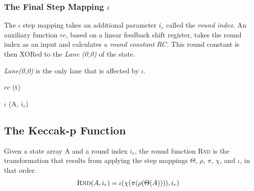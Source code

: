 \subsubsection{The Final Step Mapping $\iota$}
The $\iota$ step mapping takes an additional parameter $i_r$ called the \emph{round index}. An auxiliary function $rc$, based on a linear feedback shift register, takes the round index as an input and calculates a \emph{round constant} $RC$. This round constant is then XORed to the \emph{Lane (0,0)} of the state.

\emph{Lane(0,0)} is the only lane that is affected by $\iota$.

\begin{algorithm}[H]
\caption{$rc$ (t)}
\label{algo:rc}
\begin{algorithmic}[1]
\EndIf{}
\EndFor{}
\end{algorithmic}
\end{algorithm}

\begin{algorithm}[H]
\caption{$\iota$ (A, $i_r$)}
\label{algo:iota}
\begin{algorithmic}[1]
\EndFor{}
\EndFor{}
\EndFor{}
\end{algorithmic}
\end{algorithm}

\subsection{The Keccak-p Function}
Given a state array A and a round index $i_r$, the round function \textsc{Rnd} is the transformation that results from applying the step mappings $\Theta$, $\rho$, $\pi$, $\chi$, and $\iota$, in that order.
$$\textsc{Rnd}(A,i_r)=\iota ( \chi ( \pi ( \rho (\Theta (A)))), i_r)$$

